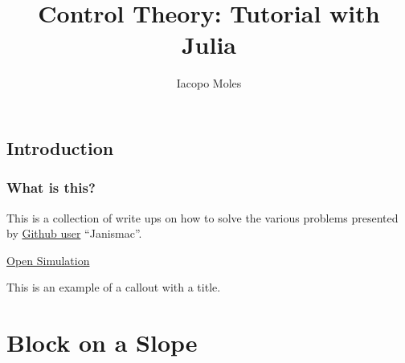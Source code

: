 \documentclass[
  8pt,
  a4paper,
]{book}
\title{Control Theory: Tutorial with Julia}
\author{Iacopo Moles}
\date{}
\renewcommand*\contentsname{Table of contents}
\newcommand\contentsname{Table of contents}
\begin{document}
\frontmatter
\maketitle


\renewcommand*\contentsname{Table of contents}
{
\setcounter{tocdepth}{2}
\tableofcontents
}

\mainmatter
{}

\chapter{Introduction}\label{introduction}

\section{What is this?}\label{what-is-this}

This is a collection of write ups on how to solve the various problems
presented by \href{https://janismac.github.io/ControlChallenges/}{Github
user} ``Janismac''.

\href{https://pages.icpmol.es/ControlChallenges/index.html?target=TutorialBlockWithFriction&code=bGV0IEtwID0gMzM3OwpsZXQgS2QgPSA2NDsKZnVuY3Rpb24gY29udHJvbEZ1bmN0aW9uKGJsb2NrKQp7CiAgcmV0dXJuIC0oIGJsb2NrLnggKiBLcCArIGJsb2NrLmR4KktkKTsKfQ==}{Open Simulation}

\begin{tcolorbox}[enhanced jigsaw, colback=white, titlerule=0mm, opacitybacktitle=0.6, coltitle=black, opacityback=0, toprule=.15mm, colframe=quarto-callout-tip-color-frame, breakable, bottomtitle=1mm, toptitle=1mm, leftrule=.75mm, title=\textcolor{quarto-callout-tip-color}{\faLightbulb}\hspace{0.5em}{Tip with Title}, rightrule=.15mm, bottomrule=.15mm, arc=.35mm, colbacktitle=quarto-callout-tip-color!10!white, left=2mm]

This is an example of a callout with a title.

\end{tcolorbox}

\part{Block on a Slope}
\end{document}
